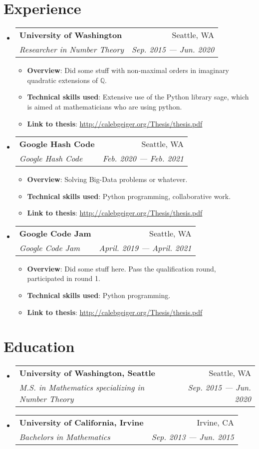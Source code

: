 \documentclass[letterpaper,11pt]{article}
\makeatletter
\newcommand{\resumeItem}[2]{
  \item\small{
    \textbf{#1}{: #2 \vspace{-2pt}}
  }
}
\newcommand{\resumeSubheading}[4]{
  \vspace{-1pt}\item
    \begin{tabular*}{0.97\textwidth}[t]{l@{\extracolsep{\fill}}r}
      \textbf{#1} & #2 \\
      \textit{\small#3} & \textit{\small #4} \\
    \end{tabular*}\vspace{-5pt}
}
\newcommand{\resumeSubHeadingListStart}{\begin{itemize}[leftmargin=*]}
\newcommand{\resumeSubHeadingListEnd}{\end{itemize}}
\newcommand{\resumeItemListStart}{\begin{itemize}}
\newcommand{\resumeItemListEnd}{\end{itemize}\vspace{-5pt}}
\makeatother
\begin{document}
\section{Experience}
\resumeSubHeadingListStart

\resumeSubheading
{University of Washington}{Seattle, WA}
{Researcher in Number Theory}{Sep. 2015 --- Jun. 2020}
\resumeItemListStart
\resumeItem{Overview}
{
    Did some stuff with non-maximal orders in imaginary quadratic extensions of $\mathbb{Q}$.
}
\resumeItem{Technical skills used}{
    Extensive use of the Python library sage, which is aimed at mathematicians who are using python.
}
\resumeItem{Link to thesis}{\url{http://calebgeiger.org/Thesis/thesis.pdf}}
\resumeItemListEnd

\resumeSubheading{Google Hash Code}{Seattle, WA}
{Google Hash Code}{Feb. 2020 --- Feb. 2021}
\resumeItemListStart
\resumeItem{Overview}
{
    Solving Big-Data problems or whatever.
}
\resumeItem{Technical skills used}{
	Python programming, collaborative work.
}
\resumeItem{Link to thesis}{\url{http://calebgeiger.org/Thesis/thesis.pdf}}
\resumeItemListEnd

\resumeSubheading{Google Code Jam}{Seattle, WA}
{Google Code Jam}{April. 2019 --- April. 2021}
\resumeItemListStart
\resumeItem{Overview}
{
    Did some stuff here. Pass the qualification round, participated in round 1.
}
\resumeItem{Technical skills used}{
    Python programming.
}
\resumeItem{Link to thesis}{\url{http://calebgeiger.org/Thesis/thesis.pdf}}
\resumeItemListEnd

\resumeSubHeadingListEnd

\section{Education}
\resumeSubHeadingListStart
\resumeSubheading
{University of Washington, Seattle}{Seattle, WA}
{M.S. in Mathematics specializing in Number Theory}{Sep. 2015
--- Jun. 2020}
\resumeSubheading
{University of California, Irvine}{Irvine, CA}
{Bachelors in Mathematics}{Sep. 2013 --- Jun. 2015}
\resumeSubHeadingListEnd


\end{document}

